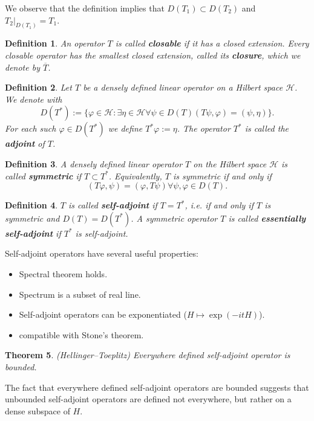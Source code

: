 \documentclass[11pt, a4paper, german]{article}
\newtheorem{theorem}{Theorem}
\newtheorem{definition}[theorem]{Definition}
\numberwithin{equation}{section}
\numberwithin{theorem}{section}
\DeclareMathOperator{\Exists}{\exists}
\DeclareMathOperator{\Forall}{\forall}
\begin{document}
We observe that the definition implies that $D(T_1)\subset D(T_2)$ and $T_2|_{D(T_1)} = T_1$.

\begin{definition}
An operator $T$ is called \textbf{closable} if it has a closed extension. Every closable operator has the smallest closed extension, called its \textbf{closure}, which we denote by $\overline{T}$.
\end{definition}

\begin{definition}
Let $T$ be a densely defined linear operator on a Hilbert space $\mathcal{H}$. We denote with $$D(T^*) := \{\varphi \in \mathcal{H} : \Exists \eta \in \mathcal{H} \Forall \psi \in D(T) (T\psi, \varphi) = (\psi, \eta) \}.$$ For each such $\varphi \in D(T^*)$ we define $T^*\varphi := \eta$. The operator $T^*$ is called the \textbf{adjoint} of $T$.
\end{definition}

\begin{definition}
A densely defined linear operator $T$ on the Hilbert space $\mathcal{H}$ is called \textbf{symmetric} if $T\subset T^*$. Equivalently, $T$ is symmetric if and only if $$(T\varphi, \psi) = (\varphi, T\psi) \Forall \psi, \varphi \in D(T).$$
\end{definition}

\begin{definition}
$T$ is called \textbf{self-adjoint} if $T = T^*$, i.e. if and only if $T$ is symmetric and $D(T) = D(T^*)$. A symmetric operator $T$ is called \textbf{essentially self-adjoint} if $T^*$ is self-adjoint.
\end{definition}

Self-adjoint operators have several useful properties:

\begin{itemize}
\item Spectral theorem holds.
\item Spectrum is a subset of real line.
\item Self-adjoint operators can be exponentiated ($H\mapsto \exp(-itH)$).
\item compatible with Stone's theorem.
\end{itemize}

\begin{theorem} (Hellinger--Toeplitz)
Everywhere defined self-adjoint operator is bounded.
\end{theorem}

The fact that everywhere defined self-adjoint operators are bounded suggests that unbounded self-adjoint operators are defined not everywhere, but rather on a dense subspace of $H$.
\end{document}

